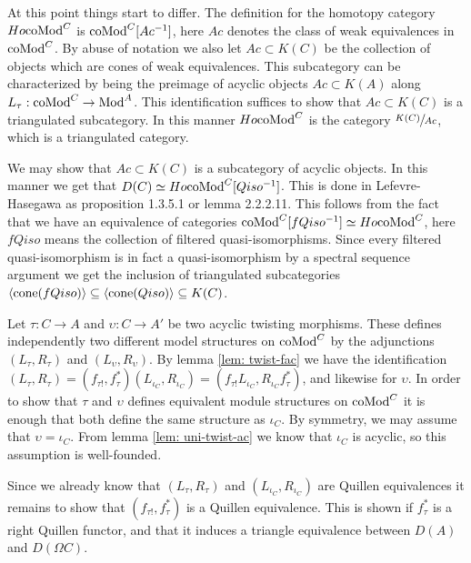 \documentclass[../thesis.tex]{subfiles}
\begin{document}
            At this point things start to differ. The definition for the homotopy category $Ho \tt{coMod}^C$ is $\tt{coMod}^C[Ac^{-1}]$, here $Ac$ denotes the class of weak equivalences in $\tt{coMod}^C$. By abuse of notation we also let $Ac\subset K(C)$ be the collection of objects which are cones of weak equivalences. This subcategory can be characterized by being the preimage of acyclic objects $Ac\subset K(A)$ along $L_\tau : \tt{coMod}^C \rightarrow \tt{Mod}^A$. This identification suffices to show that $Ac\subset K(C)$ is a triangulated subcategory. In this manner $Ho \tt{coMod}^C$ is the category $\sfrac{K(C)}{Ac}$, which is a triangulated category.

            \begin{remark}
                We may show that $Ac\subset K(C)$ is a subcategory of acyclic objects. In this manner we get that $D(C) \simeq Ho \tt{coMod}^C[Qiso^{-1}]$. This is done in Lefevre-Hasegawa \cite{LefevreHasegawa03} as proposition 1.3.5.1 or lemma 2.2.2.11. This follows from the fact that we have an equivalence of categories $\tt{coMod}^C[fQiso^{-1}]\simeq Ho \tt{coMod}^C$, here $fQiso$ means the collection of filtered quasi-isomorphisms. Since every filtered quasi-isomorphism is in fact a quasi-isomorphism by a spectral sequence argument we get the inclusion of triangulated subcategories $\langle \tt{cone}(fQiso)\rangle \subseteq \langle \tt{cone}(Qiso)\rangle \subseteq K(C)$.
            \end{remark}

            Let $\tau: C \rightarrow A$ and $\upsilon : C \rightarrow A'$ be two acyclic twisting morphisms. These defines independently two different model structures on $\tt{coMod}^C$ by the adjunctions $(L_\tau, R_\tau)$ and $(L_\upsilon, R_\upsilon)$. By lemma \ref{lem: twist-fac} we have the identification $(L_\tau, R_\tau) = (f_{\tau !},f_\tau^*)(L_{\iota_C},R_{\iota_C}) = (f_{\tau !}L_{\iota_C},R_{\iota_C}f_\tau^*)$, and likewise for $\upsilon$. In order to show that $\tau$ and $\upsilon$ defines equivalent module structures on $\tt{coMod}^C$ it is enough that both define the same structure as $\iota_C$. By symmetry, we may assume that $\upsilon = \iota_C$. From lemma \ref{lem: uni-twist-ac} we know that $\iota_C$ is acyclic, so this assumption is well-founded.

            Since we already know that $(L_\tau, R_\tau)$ and $(L_{\iota_C}, R_{\iota_C})$ are Quillen equivalences it remains to show that $(f_{\tau !},f_\tau^*)$ is a Quillen equivalence. This is shown if $f_\tau^*$ is a right Quillen functor, and that it induces a triangle equivalence between $D(A)$ and $D(\Omega C)$.
\end{document}
